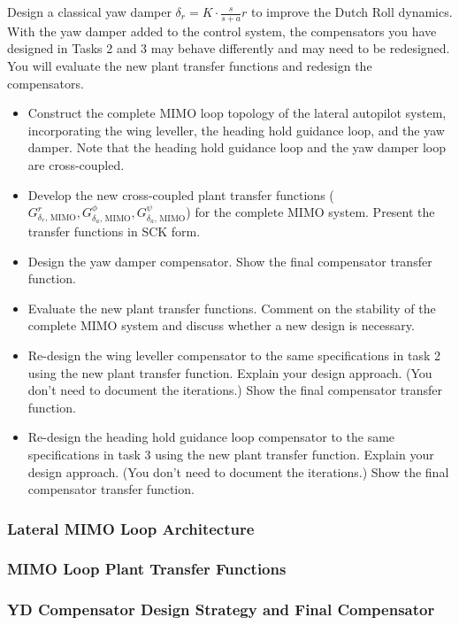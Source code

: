 Design a classical yaw damper $\delta_r = K \cdot \frac{s}{s+a} r$ to improve the Dutch Roll dynamics. With the yaw damper added to the control system, the compensators you have designed in Tasks 2 and 3 may behave differently and may need to be redesigned. You will evaluate the new plant transfer functions and redesign the compensators.
\begin{itemize}
\item Construct the complete MIMO loop topology of the lateral autopilot system, incorporating the wing leveller, the heading hold guidance loop, and the yaw damper. Note that the heading hold guidance loop and the yaw damper loop are cross-coupled.
\item Develop the new cross-coupled plant transfer functions ($G^{r}_{\delta_r \text{, MIMO}}, G^{\phi}_{\delta_a \text{, MIMO}}, G^{\psi}_{\delta_a \text{, MIMO}}$) for the complete MIMO system. Present the transfer functions in SCK form.
\item Design the yaw damper compensator. Show the final compensator transfer function.
\item Evaluate the new plant transfer functions. Comment on the stability of the complete MIMO system and discuss whether a new design is necessary.
\item Re-design the wing leveller compensator to the same specifications in task 2 using the new plant transfer function. Explain your design approach. (You don’t need to document the iterations.) Show the final compensator transfer function.
\item Re-design the heading hold guidance loop compensator to the same specifications in task 3 using the new plant transfer function. Explain your design approach. (You don’t need to document the iterations.) Show the final compensator transfer function.
\end{itemize}
\subsubsection{Lateral MIMO Loop Architecture}

\subsubsection{MIMO Loop Plant Transfer Functions}

\subsubsection{YD Compensator Design Strategy and Final Compensator}

